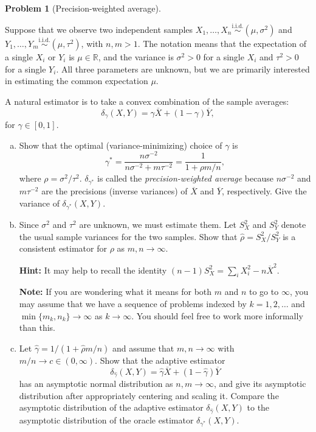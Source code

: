 \documentclass{article}
\newcommand{\RR}{\mathbb{R}}
\newcommand{\simiid}{\overset{\text{i.i.d.}}{\sim}}
\theoremstyle{definition}
\newtheorem{problem}{Problem}
\begin{document}
\begin{problem}[Precision-weighted average]
\label{prob:prec-weights}

 Suppose that we observe two independent samples $X_1,\ldots,X_n\simiid (\mu, \sigma^2)$ and $Y_1,\ldots,Y_m \simiid (\mu, \tau^2)$, with $n,m> 1$. The notation means that the expectation of a single $X_i$ or $Y_i$ is $\mu\in \RR$, and the variance is $\sigma^2>0$ for a single $X_i$ and $\tau^2>0$ for a single $Y_i$. All three parameters are unknown, but we are primarily interested in estimating the common expectation $\mu$.

A natural estimator is to take a convex combination of the sample averages:
\[
\delta_\gamma(X,Y) = \gamma \overline X + (1-\gamma) \overline Y,
\]
for $\gamma \in [0,1]$.

\begin{enumerate}[(a)]

\item Show that the optimal (variance-minimizing) choice of $\gamma$ is
\[
\gamma^* = \frac{n\sigma^{-2}}{n\sigma^{-2}+m\tau^{-2}} = \frac{1}{1+\rho m/n},
\]
where $\rho = \sigma^2/\tau^2$. $\delta_{\gamma^*}$ is called the {\em precision-weighted average} because $n\sigma^{-2}$ and $m\tau^{-2}$ are the precisions (inverse variances) of $\overline{X}$ and $\overline{Y}$, respectively. Give the variance of $\delta_{\gamma^*}(X,Y)$.



\item Since $\sigma^2$ and $\tau^2$ are unknown, we must estimate them. Let $S_X^2$ and $S_Y^2$ denote the usual sample variances for the two samples. Show that $\hat\rho = S_X^2/S_Y^2$ is a consistent estimator for $\rho$ as $m,n \to \infty$.

{\bf Hint:} It may help to recall the identity $(n-1)S_X^2 = \sum_i X_i^2 - n\overline{X}^2$.

{\bf Note:} If you are wondering what it means for both $m$ and $n$ to go to $\infty$, you may assume that we have a sequence of problems indexed by $k=1,2,\ldots$ and $\min \{m_k,n_k\} \to \infty$ as $k\to\infty$. You should feel free to work more informally than this.



\item Let $\hat\gamma = 1/(1+\hat\rho m/n)$ and assume that $m,n\to\infty$ with $m/n \to c \in (0,\infty)$. Show that the adaptive estimator
\[
\delta_{\hat\gamma}(X,Y) = \hat\gamma \overline X + (1-\hat\gamma) \overline Y
\]
has an asymptotic normal distribution as $n,m\to \infty$, and give its asymptotic distribution after appropriately centering and scaling it. Compare the asymptotic distribution of the adaptive estimator $\delta_{\hat\gamma}(X,Y)$ to the asymptotic distribution of the oracle estimator $\delta_{\gamma^*}(X,Y)$.


\end{enumerate}
\end{problem}
\end{document}
